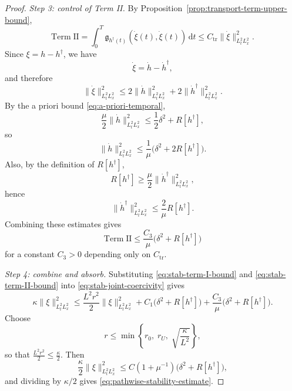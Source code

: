 \documentclass[10pt,a4paper]{amsart}
\renewcommand{\d}{\mathrm{d}}
\begin{document}
\begin{proof}
    \medskip
    \noindent
    \emph{Step 3: control of Term II.}
    By Proposition~\ref{prop:transport-term-upper-bound},
    \[
        \mathrm{Term\;II}
        =
        \int_0^T \mathfrak g_{h^\dagger(t)}(\dot\xi(t),\dot\xi(t))\,\d t
        \le
        C_{\mathrm{tr}}\|\dot\xi\|_{L^2_tL^2_x}^2.
    \]
    Since \(\xi=h-h^\dagger\), we have
    \[
        \dot\xi=\dot h-\dot h^\dagger,
    \]
    and therefore
    \[
        \|\dot\xi\|_{L^2_tL^2_x}^2
        \le
        2\|\dot h\|_{L^2_tL^2_x}^2
        +
        2\|\dot h^\dagger\|_{L^2_tL^2_x}^2.
    \]
    By the a priori bound \eqref{eq:a-priori-temporal},
    \[
        \frac{\mu}{2}\|\dot h\|_{L^2_tL^2_x}^2
        \le
        \frac12\delta^2+R[h^\dagger],
    \]
    so
    \[
        \|\dot h\|_{L^2_tL^2_x}^2
        \le
        \frac{1}{\mu}\bigl(\delta^2+2R[h^\dagger]\bigr).
    \]
    Also, by the definition of \(R[h^\dagger]\),
    \[
        R[h^\dagger]
        \ge
        \frac{\mu}{2}\|\dot h^\dagger\|_{L^2_tL^2_x}^2,
    \]
    hence
    \[
        \|\dot h^\dagger\|_{L^2_tL^2_x}^2
        \le
        \frac{2}{\mu}R[h^\dagger].
    \]
    Combining these estimates gives
    \begin{equation}
        \label{eq:stab-term-II-bound}
        \mathrm{Term\;II}
        \le
        \frac{C_3}{\mu}\bigl(\delta^2+R[h^\dagger]\bigr)
    \end{equation}
    for a constant \(C_3>0\) depending only on \(C_{\mathrm{tr}}\).

    \medskip
    \noindent
    \emph{Step 4: combine and absorb.}
    Substituting \eqref{eq:stab-term-I-bound} and \eqref{eq:stab-term-II-bound} into
    \eqref{eq:stab-joint-coercivity} gives
    \[
        \kappa\|\xi\|_{L^2_tL^2_x}^2
        \le
        \frac{L^2 r^2}{2}\|\xi\|_{L^2_tL^2_x}^2
        +
        C_1\bigl(\delta^2+R[h^\dagger]\bigr)
        +
        \frac{C_3}{\mu}\bigl(\delta^2+R[h^\dagger]\bigr).
    \]
    Choose
    \[
        r
        \le
        \min\left\{r_0,\;r_U,\;\sqrt{\frac{\kappa}{L^2}}\right\},
    \]
    so that \(\frac{L^2 r^2}{2}\le \frac\kappa2\). Then
    \[
        \frac\kappa2\|\xi\|_{L^2_tL^2_x}^2
        \le
        C(1+\mu^{-1})\bigl(\delta^2+R[h^\dagger]\bigr),
    \]
    and dividing by \(\kappa/2\) gives \eqref{eq:pathwise-stability-estimate}.
\end{proof}
\end{document}
